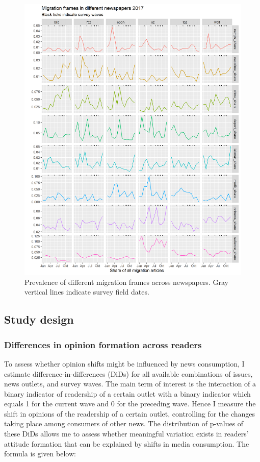 \documentclass{article}
\begin{document}
\begin{figure}[!ht]
    \centering
    \includegraphics[width=\textwidth]{paper/vis/frames_papers_focus.png}
    \caption{Prevalence of different migration frames across newspapers. Gray vertical lines indicate survey field dates.}
    \label{fig:frames}
\end{figure}


\subsection{Study design}

\subsubsection{Differences in opinion formation across readers}

To assess whether opinion shifts might be influenced by news consumption, I estimate difference-in-differences (DiDs) for all available combinations of issues, news outlets, and survey waves. The main term of interest is the interaction of a binary indicator of readership of a certain outlet with a binary indicator which equals 1 for the current wave and 0 for the preceding wave. Hence I measure the shift in opinions of the readership of a certain outlet, controlling for the changes taking place among consumers of other news. The distribution of p-values of these DiDs allows me to assess whether meaningful variation exists in readers' attitude formation that can be explained by shifts in media consumption. The formula is given below:
\end{document}
